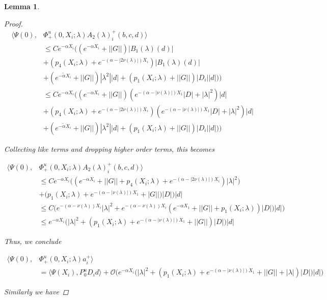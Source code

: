 \documentclass[12pt]{article}
\newtheorem{lemma}{Lemma}
\begin{document}
\begin{lemma}
\begin{proof}
\begin{align*}
\langle \Psi(0), &\Phi^u_+(0, X_i; \lambda) A_2(\lambda)_i^+(b,c,d) \rangle \\
&\leq C e^{-\alpha X_i}  \Big( (e^{-\alpha X_i} + ||G||)|B_1(\lambda)(d)| \\
&+ ( p_4(X_i; \lambda) + e^{-(\alpha - |2 \nu(\lambda)|)X_i} )|B_1(\lambda)(d)| \\
&+ (e^{-\tilde{\alpha} X_i} + ||G||) |\lambda^2| |d| +(p_1(X_i; \lambda) + ||G|| )|D_i||d|) \Big) \\
&\leq C e^{-\alpha X_i}  \Big( (e^{-\alpha X_i} + ||G||)( e^{-(\alpha - |\nu(\lambda)|) X_1} |D| + |\lambda|^2 )|d| \\
&+ ( p_4(X_i; \lambda) + e^{-(\alpha - |2 \nu(\lambda)|)X_i} )( e^{-(\alpha - |\nu(\lambda)|) X_1} |D| + |\lambda|^2 )|d| \\
&+ (e^{-\tilde{\alpha} X_i} + ||G||) |\lambda^2| |d| +(p_1(X_i; \lambda) + ||G|| )|D_i||d|) \Big) 
\end{align*}

Collecting like terms and dropping higher order terms, this becomes

\begin{align*}
\langle \Psi(0), &\Phi^u_+(0, X_i; \lambda) A_2(\lambda)_i^+(b,c,d) \rangle \\
&\leq C e^{-\alpha X_i} \Big( (e^{-\alpha X_i} + ||G|| + p_4(X_i; \lambda) + e^{-(\alpha - |2 \nu(\lambda)|)X_i} ) |\lambda|^2 ) \\
&+ (p_1(X_i; \lambda) + e^{-(\alpha - |\nu(\lambda)|) X_1} + |G|| )|D| \Big)|d| \\
&\leq C \Big( e^{-(\alpha - \nu(\lambda)) X_i} |\lambda|^2 
+ e^{-(\alpha - \nu(\lambda)) X_i}( e^{-\alpha X_1} + ||G|| + p_1(X_i; \lambda))|D| )|d| \Big) \\
&\leq e^{-\alpha X_i} \Big( |\lambda|^2  + (p_1(X_i; \lambda) + e^{-(\alpha - |\nu(\lambda)|) X_1} + ||G|| )|D| \Big)|d| 
\end{align*}

Thus, we conclude

\begin{align*}
\langle \Psi(0), &\Phi^u_+(0, X_i; \lambda) a_i^+ \rangle \\
&= \langle \Psi(X_i), P^u_0 D_i d \rangle + \mathcal{O}\Big(e^{-\alpha X_i} \Big( |\lambda|^2  + (p_1(X_i; \lambda) + e^{-(\alpha - |\nu(\lambda)|) X_1} + ||G|| + |\lambda|)|D| \Big)|d| \Big)
\end{align*}

Similarly we have


\end{proof}
\end{lemma}
\end{document}
